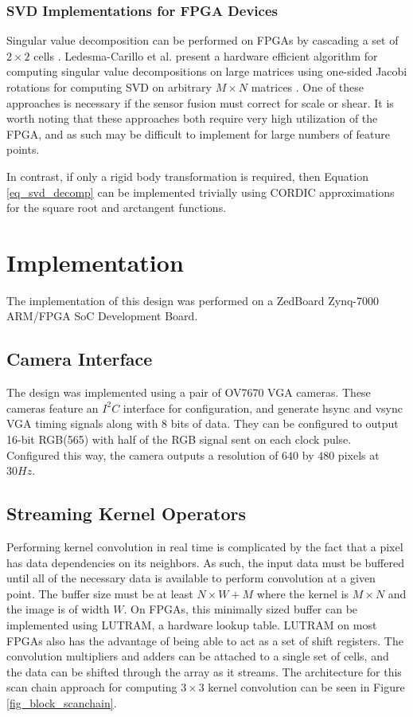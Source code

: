 \documentclass[sigconf]{acmart/acmart}
\begin{document}
\subsubsection{SVD Implementations for FPGA Devices}

Singular value decomposition can be performed on FPGAs by cascading a set of $2 \times 2$ cells \cite{wang_singular_2010}. Ledesma-Carillo et al. present a hardware efficient algorithm for computing singular value decompositions on large matrices using one-sided Jacobi rotations for computing SVD on arbitrary $M \times N$ matrices \cite{ledesma-carrillo_reconfigurable_2011}. One of these approaches is necessary if the sensor fusion must correct for scale or shear. It is worth noting that these approaches both require very high utilization of the FPGA, and as such may be difficult to implement for large numbers of feature points.

In contrast, if only a rigid body transformation is required, then Equation \ref{eq_svd_decomp} can be implemented trivially using CORDIC approximations for the square root and arctangent functions.

\section{Implementation}

The implementation of this design was performed on a ZedBoard Zynq-7000 ARM/FPGA SoC Development Board.

\subsection{Camera Interface}

The design was implemented using a pair of OV7670 VGA cameras. These cameras feature an $I^2C$ interface for configuration, and generate hsync and vsync VGA timing signals along with 8 bits of data. They can be configured to output 16-bit RGB(565) with half of the RGB signal sent on each clock pulse. Configured this way, the camera outputs a resolution of $640$ by $480$ pixels at $30Hz$. 

\subsection{Streaming Kernel Operators}

Performing kernel convolution in real time is complicated by the fact that a pixel has data dependencies on its neighbors. As such, the input data must be buffered until all of the necessary data is available to perform convolution at a given point. The buffer size must be at least $N \times W + M$ where the kernel is $M \times N$ and the image is of width $W$. On FPGAs, this minimally sized buffer can be implemented using LUTRAM, a hardware lookup table. LUTRAM on most FPGAs also has the advantage of being able to act as a set of shift registers. The convolution multipliers and adders can be attached to a single set of cells, and the data can be shifted through the array as it streams. The architecture for this scan chain approach for computing $3 \times 3$ kernel convolution can be seen in Figure \ref{fig_block_scanchain}.
\end{document}
